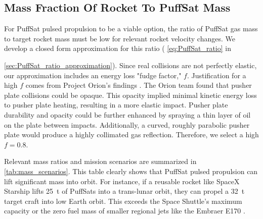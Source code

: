 \documentclass{article}
\begin{document}
\subsection{Mass Fraction Of Rocket To PuffSat Mass}
For PuffSat pulsed propulsion to be a viable option, the ratio of PuffSat gas mass to target rocket mass must be low for relevant rocket velocity changes. We develop a closed form approximation for this ratio ( \autoref{eq:PuffSat_ratio} in {\autoref{sec:PuffSat_ratio_approximation}). Since real collisions are not perfectly elastic, our approximation includes an energy loss "fudge factor," $f$.  Justification for a high $f$ comes from Project Orion's findings \cite{orion_reflections}.   The Orion team found that pusher plate collisions could be opaque. This opacity implied minimal kinetic energy loss to pusher plate heating, resulting in a more elastic impact. Pusher plate durability and opacity could be further enhanced by spraying a thin layer of oil on the plate between impacts.   Additionally, a curved, roughly parabolic pusher plate would produce a  highly collimated gas reflection. Therefore, we select a high  $f=0.8$.   

Relevant mass ratios and mission scenarios are summarized in \autoref{tab:mass_scenarios}. This table clearly shows that PuffSat pulsed propulsion can lift significant mass into orbit. For instance, if a reusable rocket like SpaceX Starship \cite{starship} lifts \SI{25}{\tonne} of PuffSats into a trans-lunar orbit, they can propel a  \SI{32}{\tonne} target craft into low Earth orbit. This exceeds the Space Shuttle's maximum capacity \cite{space_shuttle_program} or the zero fuel mass of smaller regional jets like the Embraer E170 \cite{embraer_e170}.

}
\end{document}
